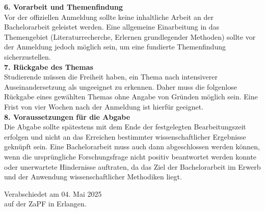 \documentclass[DIV=calc]{scrartcl}
\begin{document}
\textbf{6. Vorarbeit und Themenfindung}\\
Vor der offiziellen Anmeldung sollte keine inhaltliche Arbeit an der Bachelorarbeit geleistet werden. Eine allgemeine Einarbeitung in das Themengebiet (Literaturrecherche, Erlernen grundlegender Methoden) sollte vor der Anmeldung jedoch möglich sein, um eine fundierte Themenfindung sicherzustellen.\\

\textbf{7. Rückgabe des Themas}\\
Studierende müssen die Freiheit haben, ein Thema nach intensiverer Auseinandersetzung als ungeeignet zu erkennen. Daher muss die folgenlose Rückgabe eines gewählten Themas ohne Angabe von Gründen möglich sein. Eine Frist von vier Wochen nach der Anmeldung ist hierfür geeignet.\\

\textbf{8. Voraussetzungen für die Abgabe}\\
Die Abgabe sollte spätestens mit dem Ende der festgelegten Bearbeitungszeit erfolgen und nicht an das Erreichen bestimmter wissenschaftlicher Ergebnisse geknüpft sein.
Eine Bachelorarbeit muss auch dann abgeschlossen werden können, wenn die ursprüngliche Forschungsfrage nicht positiv beantwortet werden konnte oder unerwartete Hindernisse auftraten, da das Ziel der Bachelorarbeit im Erwerb und der Anwendung wissenschaftlicher Methodiken liegt. 








\vspace{1cm} 
%
\vfill
\begin{flushright}
	Verabschiedet am 04. Mai 2025 \\
	auf der ZaPF in Erlangen.
\end{flushright}
\end{document}
